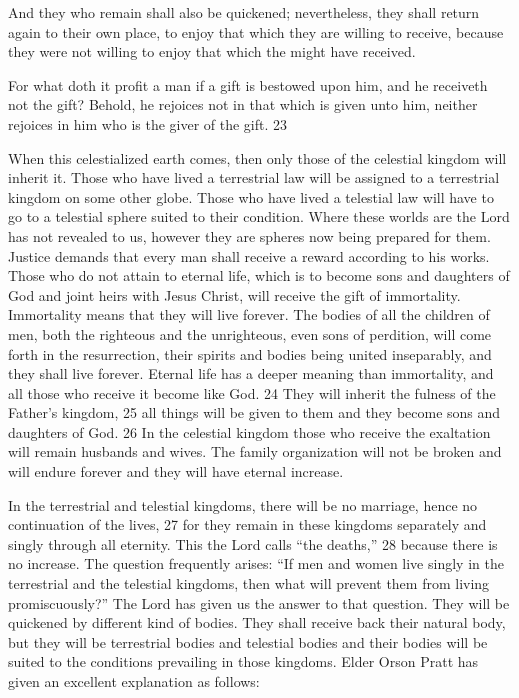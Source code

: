 And they who remain shall also be quickened; nevertheless, they shall return again to their
own place, to enjoy that which they are willing to receive, because they were not willing to
enjoy that which the might have received.

For what doth it profit a man if a gift is bestowed upon him, and he receiveth not the gift?
Behold, he rejoices not in that which is given unto him, neither rejoices in him who is the
giver of the gift. 23

When this celestialized earth comes, then only those of the celestial kingdom will inherit it.
Those who have lived a terrestrial law will be assigned to a terrestrial kingdom on some other
globe. Those who have lived a telestial law will have to go to a telestial sphere suited to their
condition. Where these worlds are the Lord has not revealed to us, however they are spheres
now being prepared for them. Justice demands that every man shall receive a reward
according to his works. Those who do not attain to eternal life, which is to become sons and
daughters of God and joint heirs with Jesus Christ, will receive the gift of immortality.
Immortality means that they will live forever. The bodies of all the children of men, both the
righteous and the unrighteous, even sons of perdition, will come forth in the resurrection,
their spirits and bodies being united inseparably, and they shall live forever. Eternal life has a
deeper meaning than immortality, and all those who receive it become like God. 24 They will
inherit the fulness of the Father's kingdom, 25 all things will be given to them and they
become sons and daughters of God. 26 In the celestial kingdom those who receive the
exaltation will remain husbands and wives. The family organization will not be broken and
will endure forever and they will have eternal increase.

In the terrestrial and telestial kingdoms, there will be no marriage, hence no continuation of
the lives, 27 for they remain in these kingdoms separately and singly through all eternity.
This the Lord calls ``the deaths,'' 28 because there is no increase. The question frequently
arises: ``If men and women live singly in the terrestrial and the telestial kingdoms, then what
will prevent them from living promiscuously?'' The Lord has given us the answer to that
question. They will be quickened by different kind of bodies. They shall receive back their
natural body, but they will be terrestrial bodies and telestial bodies and their bodies will be
suited to the conditions prevailing in those kingdoms. Elder Orson Pratt has given an
excellent explanation as follows:

